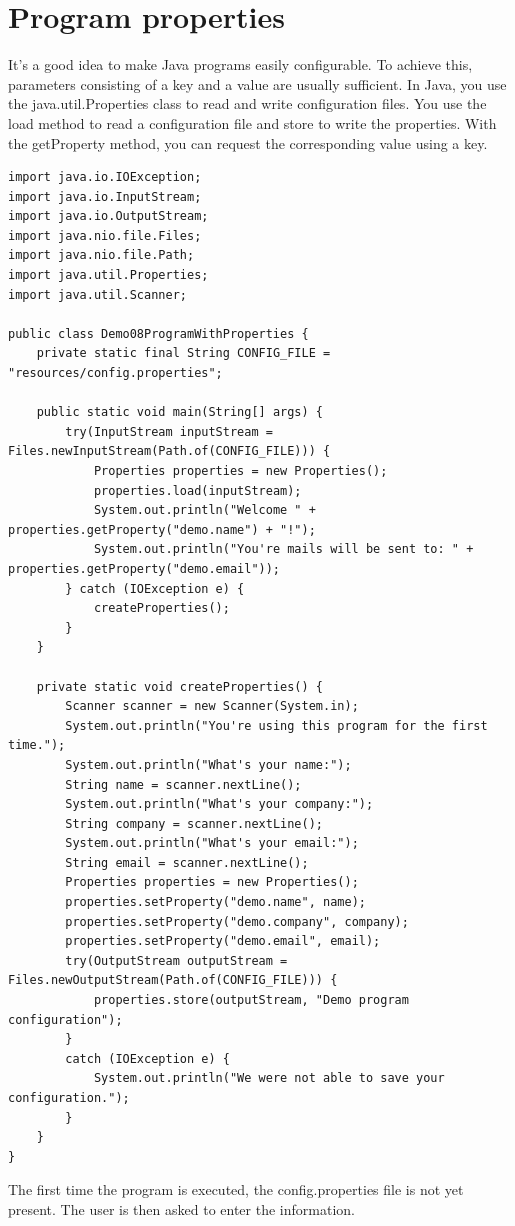 \section{Program properties}

It's a good idea to make Java programs easily configurable. To achieve this, parameters consisting of a key and a value are usually sufficient. In Java, you use the java.util.Properties class to read and write configuration files. You use the load method to read a configuration file and store to write the properties. With the getProperty method, you can request the corresponding value using a key.

\begin{lstlisting}
import java.io.IOException;
import java.io.InputStream;
import java.io.OutputStream;
import java.nio.file.Files;
import java.nio.file.Path;
import java.util.Properties;
import java.util.Scanner;

public class Demo08ProgramWithProperties {
	private static final String CONFIG_FILE = "resources/config.properties";

	public static void main(String[] args) {
		try(InputStream inputStream = Files.newInputStream(Path.of(CONFIG_FILE))) {
			Properties properties = new Properties();
			properties.load(inputStream);
			System.out.println("Welcome " + properties.getProperty("demo.name") + "!");
			System.out.println("You're mails will be sent to: " + properties.getProperty("demo.email"));
		} catch (IOException e) {
			createProperties();
		}
	}

	private static void createProperties() {
		Scanner scanner = new Scanner(System.in);
		System.out.println("You're using this program for the first time.");
		System.out.println("What's your name:");
		String name = scanner.nextLine();
		System.out.println("What's your company:");
		String company = scanner.nextLine();
		System.out.println("What's your email:");
		String email = scanner.nextLine();
		Properties properties = new Properties();
		properties.setProperty("demo.name", name);
		properties.setProperty("demo.company", company);
		properties.setProperty("demo.email", email);
		try(OutputStream outputStream = Files.newOutputStream(Path.of(CONFIG_FILE))) {
			properties.store(outputStream, "Demo program configuration");
		}
		catch (IOException e) {
			System.out.println("We were not able to save your configuration.");
		}
	}
}
\end{lstlisting}

The first time the program is executed, the config.properties file is not yet present. The user is then asked to enter the information.

